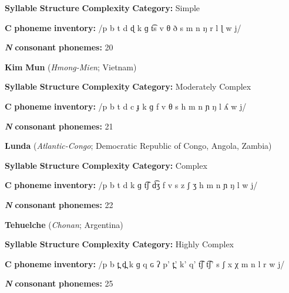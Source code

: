 \textbf{Syllable} \textbf{Structure} \textbf{Complexity} \textbf{Category:} Simple



\textbf{C} \textbf{phoneme} \textbf{inventory:} /p b t d ɖ k ɡ t͡s v θ ð s m n ŋ r l ɭ w j/



\textbf{\textit{N}} \textbf{consonant} \textbf{phonemes:} 20

\z


\ea\label{ex:(4.23)}
  \textbf{Kim} \textbf{Mun} (\textit{Hmong-Mien}; Vietnam)



\textbf{Syllable} \textbf{Structure} \textbf{Complexity} \textbf{Category:} Moderately Complex



\textbf{C} \textbf{phoneme} \textbf{inventory:} /p b t d c ɟ k ɡ f v θ s h m n ɲ ŋ l ʎ w j/



\textbf{\textit{N}} \textbf{consonant} \textbf{phonemes:} 21
\z



\ea\label{ex:(4.24)}
  \textbf{Lunda} (\textit{Atlantic-Congo}; Democratic Republic of Congo, Angola, Zambia)



\textbf{Syllable} \textbf{Structure} \textbf{Complexity} \textbf{Category:} Complex



\textbf{C} \textbf{phoneme} \textbf{inventory:} /p b t d k ɡ t͡ʃ d͡ʒ f v s z ʃ ʒ h m n ɲ ŋ l w j/



\textbf{\textit{N}} \textbf{consonant} \textbf{phonemes:} 22
\z



\ea\label{ex:(4.25)}
  \textbf{Tehuelche} (\textit{Chonan}; Argentina)



\textbf{Syllable} \textbf{Structure} \textbf{Complexity} \textbf{Category:} Highly Complex



\textbf{C} \textbf{phoneme} \textbf{inventory:} /p b t̪ d̪ k ɡ q ɢ ʔ p’ t̪’ k’ q’ t͡ʃ t͡ʃ’ s ʃ x χ m n l r w j/



\textbf{\textit{N}} \textbf{consonant} \textbf{phonemes:} 25

\z



